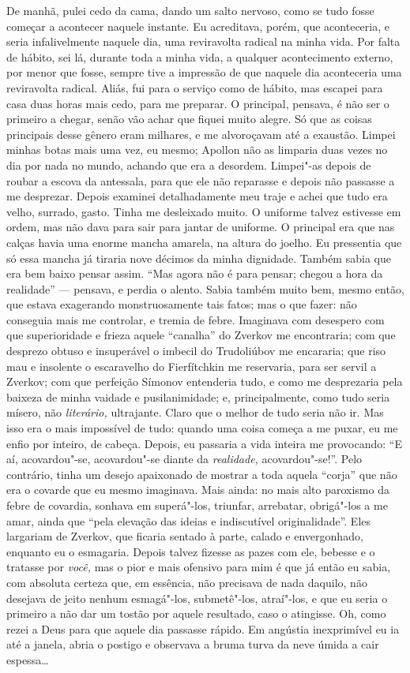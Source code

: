 De manhã, pulei cedo da cama, dando um salto nervoso, como se tudo fosse
começar a acontecer naquele instante. Eu acreditava, porém, que
aconteceria, e seria infalivelmente naquele dia, uma reviravolta radical
na minha vida. Por falta de hábito, sei lá, durante toda a minha vida, a
qualquer acontecimento externo, por menor que fosse, sempre tive a
impressão de que naquele dia aconteceria uma reviravolta radical. Aliás,
fui para o serviço como de hábito, mas escapei para casa duas horas mais
cedo, para me preparar. O principal, pensava, é não ser o primeiro a
chegar, senão vão achar que fiquei muito alegre. Só que as coisas
principais desse gênero eram milhares, e me alvoroçavam até a exaustão.
Limpei minhas botas mais uma vez, eu mesmo; Apollon não as limparia duas
vezes no dia por nada no mundo, achando que era a desordem. Limpei"-as
depois de roubar a escova da antessala, para que ele não reparasse e
depois não passasse a me desprezar. Depois examinei detalhadamente meu
traje e achei que tudo era velho, surrado, gasto. Tinha me desleixado
muito. O uniforme talvez estivesse em ordem, mas não dava para sair para
jantar de uniforme. O principal era que nas calças havia uma enorme
mancha amarela, na altura do joelho. Eu pressentia que só essa mancha já
tiraria nove décimos da minha dignidade. Também sabia que era bem baixo
pensar assim. ``Mas agora não é para pensar; chegou a hora da
realidade'' --- pensava, e perdia o alento. Sabia também muito bem, mesmo
então, que estava exagerando monstruosamente tais fatos; mas o que
fazer: não conseguia mais me controlar, e tremia de febre. Imaginava com
desespero com que superioridade e frieza aquele ``canalha'' do Zverkov
me encontraria; com que desprezo obtuso e insuperável o imbecil do
Trudoliúbov me encararia; que riso mau e insolente o escaravelho do
Fierfítchkin me reservaria, para ser servil a Zverkov; com que perfeição
Símonov entenderia tudo, e como me desprezaria pela baixeza de minha
vaidade e pusilanimidade; e, principalmente, como tudo seria mísero, não
\emph{literário,} ultrajante. Claro que o melhor de tudo seria não ir.
Mas isso era o mais impossível de tudo: quando uma coisa começa a me
puxar, eu me enfio por inteiro, de cabeça. Depois, eu passaria a vida
inteira me provocando: ``E aí, acovardou"-se, acovardou"-se diante da
\emph{realidade,} acovardou"-se!''. Pelo contrário, tinha um desejo
apaixonado de mostrar a toda aquela ``corja'' que não era o covarde que
eu mesmo imaginava. Mais ainda: no mais alto paroxismo da febre de
covardia, sonhava em superá"-los, triunfar, arrebatar, obrigá"-los a me
amar, ainda que ``pela elevação das ideias e indiscutível
originalidade''. Eles largariam de Zverkov, que ficaria sentado à parte,
calado e envergonhado, enquanto eu o esmagaria. Depois talvez fizesse as
pazes com ele, bebesse e o tratasse por \emph{você,} mas o pior e mais
ofensivo para mim é que já então eu sabia, com absoluta certeza que, em
essência, não precisava de nada daquilo, não desejava de jeito nenhum
esmagá"-los, submetê"-los, atraí"-los, e que eu seria o primeiro a não dar
um tostão por aquele resultado, caso o atingisse. Oh, como rezei a Deus
para que aquele dia passasse rápido. Em angústia inexprimível eu ia até
a janela, abria o postigo e observava a bruma turva da neve úmida a cair
espessa\ldots{}


